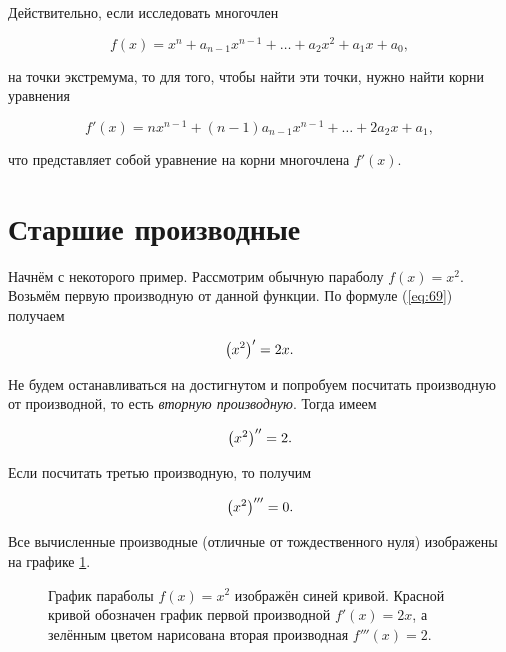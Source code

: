 \documentclass[12pt]{article}
\begin{document}
\par
Действительно, если исследовать многочлен

\begin{equation}
	f(x) = x^n + a_{n-1}x^{n-1} + \ldots + a_2 x^2 + a_1 x + a_0,
\end{equation}

на точки экстремума, то для того, чтобы найти эти точки, нужно найти корни уравнения

\begin{equation}
	f'(x) = n x^{n-1} + (n-1)a_{n-1}x^{n-1} + \ldots + 2 a_2 x + a_1,
\end{equation}

что представляет собой уравнение на корни многочлена $f'(x)$.

\section{Старшие производные}
Начнём с некоторого пример. Рассмотрим обычную параболу $f(x) = x^2$. Возьмём первую производную от данной функции. По формуле (\ref{eq:69}) получаем

\begin{equation}
	\qty(x^2)' = 2 x.
\end{equation}

Не будем останавливаться на достигнутом и попробуем посчитать производную от производной, то есть \emph{вторную производную}. Тогда имеем

\begin{equation}
	\qty(x^2)'' = 2.
\end{equation}

Если посчитать третью производную, то получим

\begin{equation}
	\qty(x^2)''' = 0.
\end{equation}

Все вычисленные производные (отличные от тождественного нуля) изображены на графике \ref{fig:69}.

\begin{figure}[htbp]
\centering
{}
\caption{График параболы $f(x) = x^2$ изображён синей кривой. Красной кривой обозначен график первой производной $f'(x) = 2x$, а зелённым цветом нарисована вторая производная $f'''(x)=2$.}
\label{fig:69}
\end{figure}
\end{document}
